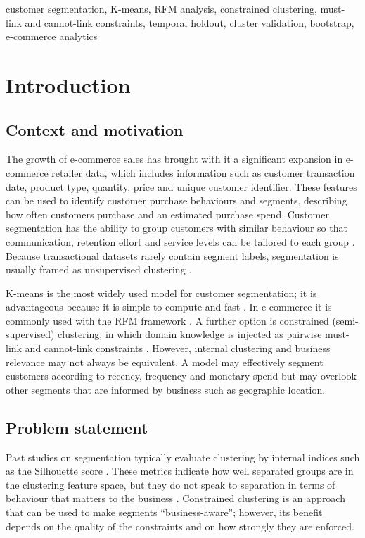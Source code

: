 \documentclass[conference,10pt]{IEEEtran}
\begin{document}
\begin{IEEEkeywords}
customer segmentation, K-means, RFM analysis, constrained clustering,
must-link and cannot-link constraints, temporal holdout, cluster validation,
bootstrap, e-commerce analytics
\end{IEEEkeywords}

\section{Introduction}
\label{sec:intro}

\subsection{Context and motivation}
The growth of e-commerce sales has brought with it a significant expansion in e-commerce retailer data, which includes information such as customer transaction date, product type, quantity, price and unique customer identifier. These features can be used to identify customer purchase behaviours and segments, describing how often customers purchase and an estimated purchase spend. Customer segmentation has the ability to
group customers with similar behaviour so that communication, retention
effort and service levels can be tailored to each group
\cite{chen2012rfm,salminen2023algorithms}. Because transactional datasets rarely
contain segment labels, segmentation is usually framed as unsupervised
clustering \cite{wani2024comprehensive,gomes2023review}.

K-means is the most widely used model for customer segmentation; it is advantageous because it is simple to compute and
fast
\cite{macqueen1967some,gomes2023review,salminen2023algorithms}. In e-commerce it is commonly used with
the RFM framework \cite{chen2012rfm,christy2021rfm}. A further
option is constrained (semi-supervised) clustering, in which domain knowledge
is injected as pairwise must-link and cannot-link constraints
\cite{wagstaff2001constrained,basu2004probabilistic}. However, internal clustering and business relevance may not always be equivalent. A model may effectively segment customers according to recency, frequency and monetary spend but may overlook other segments that are informed by business such as geographic location.

\subsection{Problem statement}
Past studies on segmentation typically evaluate clustering by internal indices
such as the Silhouette score \cite{rousseeuw1987silhouettes}. These metrics indicate how well separated groups are in the clustering feature space, but they do not speak to separation in terms of behaviour that matters to the
business \cite{salminen2023algorithms}. Constrained
clustering is an approach that can be used to make segments ``business-aware''; however, its benefit
depends on the quality of the constraints and on how strongly they are enforced. 
\end{document}
